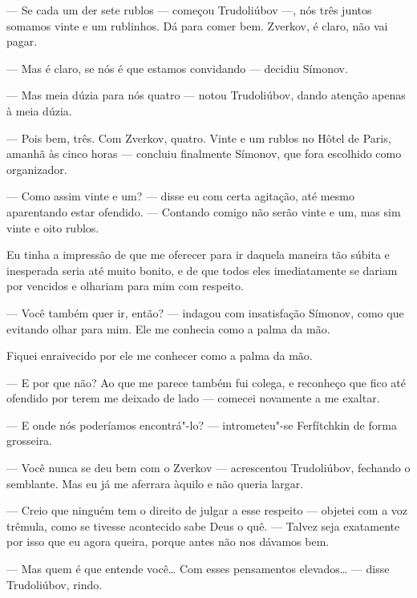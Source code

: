 --- Se cada um der sete rublos --- começou Trudoliúbov ---, nós três juntos
somamos vinte e um rublinhos. Dá para comer bem. Zverkov, é claro, não
vai pagar.

--- Mas é claro, se nós é que estamos convidando --- decidiu Símonov.


--- Mas meia dúzia para nós quatro --- notou Trudoliúbov, dando atenção
apenas à meia dúzia.

--- Pois bem, três. Com Zverkov, quatro. Vinte e um rublos no
Hôtel de Paris, amanhã às cinco horas --- concluiu
finalmente Símonov, que fora escolhido como organizador.

--- Como assim vinte e um? --- disse eu com certa agitação, até mesmo
aparentando estar ofendido. --- Contando comigo não serão vinte e um, mas
sim vinte e oito rublos.


Eu tinha a impressão de que me oferecer para ir daquela maneira tão
súbita e inesperada seria até muito bonito, e de que todos eles
imediatamente se dariam por vencidos e olhariam para mim com respeito.

--- Você também quer ir, então? --- indagou com insatisfação Símonov, como
que evitando olhar para mim. Ele me conhecia como a palma da mão.

Fiquei enraivecido por ele me conhecer como a palma da mão.

--- E por que não? Ao que me parece também fui colega, e reconheço que
fico até ofendido por terem me deixado de lado --- comecei novamente a
me exaltar.

--- E onde nós poderíamos encontrá"-lo? --- intrometeu"-se Ferfítchkin de
forma grosseira.

--- Você nunca se deu bem com o Zverkov --- acrescentou Trudoliúbov,
fechando o semblante. Mas eu já me aferrara àquilo e não queria largar.

--- Creio que ninguém tem o direito de julgar a esse respeito --- objetei
com a voz trêmula, como se tivesse acontecido sabe Deus o quê. --- Talvez
seja exatamente por isso que eu agora queira, porque antes não nos
dávamos bem.

--- Mas quem é que entende você\ldots{} Com esses pensamentos elevados\ldots{} ---
disse Trudoliúbov, rindo.

